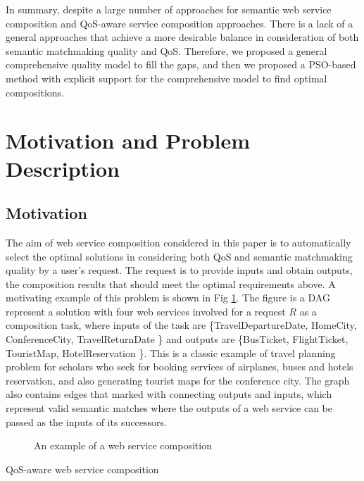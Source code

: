 \documentclass{llncs}
\begin{document}
In summary, despite a large number of approaches for semantic web service composition and QoS-aware service composition approaches. There is a lack of a general approaches that achieve a more desirable balance in consideration of both semantic matchmaking quality and QoS. Therefore, we proposed a general comprehensive quality model to fill the gaps, and then we proposed a PSO-based method with explicit support for the comprehensive model to find optimal compositions.

\section{Motivation and Problem Description}\label{problemDes}
\subsection{Motivation}\label{Motivation}

The aim of web service composition considered in this paper is to automatically select the optimal solutions in considering both QoS and semantic matchmaking quality by a user's request. The request is to provide inputs and obtain outputs, the composition results that should meet the optimal requirements above. A motivating example of this problem is shown in Fig \ref{motivation}. The figure is a DAG represent a solution with four web services involved for a request $R$ as a composition task, where inputs of the task are \{TravelDepartureDate, HomeCity, ConferenceCity, TravelReturnDate \} and outputs are \{BusTicket, FlightTicket, TouristMap, HotelReservation \}. This is a classic example of travel planning problem for scholars who seek for booking services of airplanes, buses and hotels reservation, and also generating tourist maps for the conference city. The graph also contains edges that marked with connecting outputs and inputs, which represent valid semantic matches where the outputs of a web service can be passed as the inputs of its successors.

\begin{figure}[h]
\centering
{}
 \caption{ An example of a web service composition}
 \label{motivation}
\end{figure}QoS-aware web service composition \cite{da2016particle,da2015graphevol,yu2013adaptive,ma2015hybrid}
\end{document}
